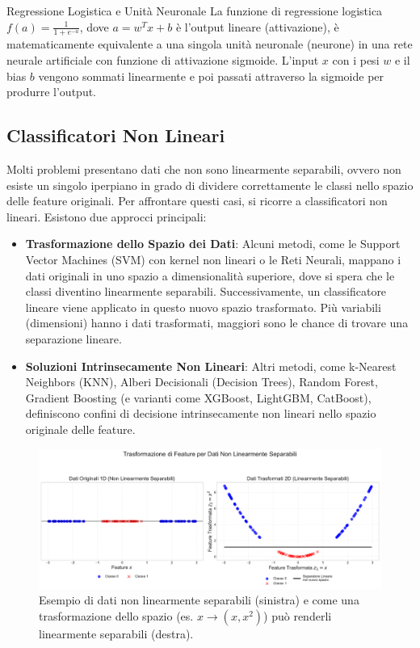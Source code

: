 \documentclass{article}
\begin{document}
\begin{notebox}{Regressione Logistica e Unità Neuronale}
    La funzione di regressione logistica $f(a) = \frac{1}{1+e^{-a}}$, dove $a = w^T x + b$ è l'output lineare (attivazione), è matematicamente equivalente a una singola unità neuronale (neurone) in una rete neurale artificiale con funzione di attivazione sigmoide. L'input $x$ con i pesi $w$ e il bias $b$ vengono sommati linearmente e poi passati attraverso la sigmoide per produrre l'output.
\end{notebox}

\subsection{Classificatori Non Lineari}
Molti problemi presentano dati che non sono linearmente separabili, ovvero non esiste un singolo iperpiano in grado di dividere correttamente le classi nello spazio delle feature originali. Per affrontare questi casi, si ricorre a classificatori non lineari. Esistono due approcci principali:
\begin{itemize}
    \item \textbf{Trasformazione dello Spazio dei Dati}: Alcuni metodi, come le Support Vector Machines (SVM) con kernel non lineari o le Reti Neurali, mappano i dati originali in uno spazio a dimensionalità superiore, dove si spera che le classi diventino linearmente separabili. Successivamente, un classificatore lineare viene applicato in questo nuovo spazio trasformato. Più variabili (dimensioni) hanno i dati trasformati, maggiori sono le chance di trovare una separazione lineare.
    \item \textbf{Soluzioni Intrinsecamente Non Lineari}: Altri metodi, come k-Nearest Neighbors (KNN), Alberi Decisionali (Decision Trees), Random Forest, Gradient Boosting (e varianti come XGBoost, LightGBM, CatBoost), definiscono confini di decisione intrinsecamente non lineari nello spazio originale delle feature.
\end{itemize}

\begin{figure}[H]
    \centering
    \includegraphics[width=1\textwidth]{images/nonlinear_data_transformation.pdf}
    \caption{Esempio di dati non linearmente separabili (sinistra) e come una trasformazione dello spazio (es. $x \rightarrow (x, x^2)$) può renderli linearmente separabili (destra).}
    \label{fig:nonlinear_data_transformation}
\end{figure}
\end{document}
